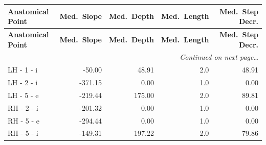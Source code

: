 \documentclass[a4paper,11pt]{article}
\begin{document}
\begin{small}
\begin{longtable}{p{4.5cm}rrrr}
\toprule
\textbf{Anatomical Point} &
\textbf{Med.\ Slope} &
\textbf{Med.\ Depth} &
\textbf{Med.\ Length} &
\textbf{Med.\ Step Decr.} \\
\midrule
\endfirsthead
\toprule
\textbf{Anatomical Point} &
\textbf{Med.\ Slope} &
\textbf{Med.\ Depth} &
\textbf{Med.\ Length} &
\textbf{Med.\ Step Decr.} \\
\midrule
\endhead
\midrule
\multicolumn{5}{r}{\small\emph{Continued on next page\ldots}} \\
\endfoot
\bottomrule
\endlastfoot
LH - 1 - i & -50.00 & 48.91 & 2.0 & 48.91 \\
LH - 2 - i & -371.15 & 0.00 & 1.0 & 0.00 \\
LH - 5 - e & -219.44 & 175.00 & 2.0 & 89.81 \\
RH - 2 - i & -201.32 & 0.00 & 1.0 & 0.00 \\
RH - 5 - e & -294.44 & 0.00 & 1.0 & 0.00 \\
RH - 5 - i & -149.31 & 197.22 & 2.0 & 79.86 \\
\end{longtable}
\end{small}
\end{document}
